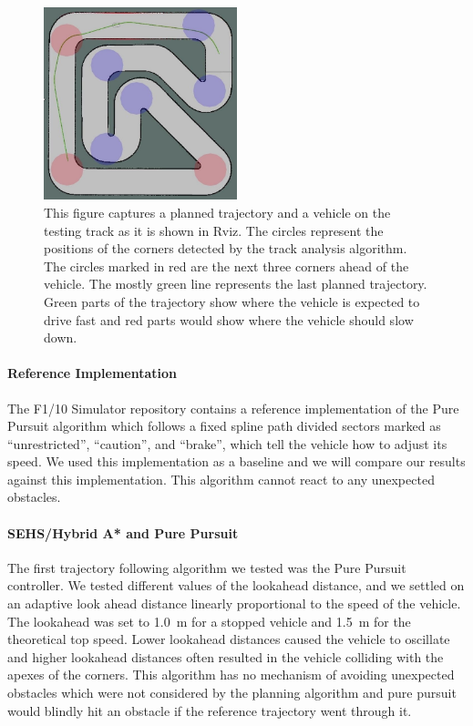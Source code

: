 \begin{figure}
	\centering
	\includegraphics[width=0.5\textwidth]{../img/experiments/rviz-planned-track.jpg}
	\caption{This figure captures a planned trajectory and a vehicle on the testing track as it is shown in Rviz. The circles represent the positions of the corners detected by the track analysis algorithm. The circles marked in red are the next three corners ahead of the vehicle. The mostly green line represents the last planned trajectory. Green parts of the trajectory show where the vehicle is expected to drive fast and red parts would show where the vehicle should slow down.}
	\label{fig:rviz-planned-track}
\end{figure}

\paragraph{Reference Implementation}
The F1/10 Simulator repository contains a reference implementation of the Pure Pursuit algorithm which follows a fixed spline path divided sectors marked as “unrestricted”, “caution”, and “brake”, which tell the vehicle how to adjust its speed. We used this implementation as a baseline and we will compare our results against this implementation. This algorithm cannot react to any unexpected obstacles.

\paragraph{\gls{SEHS}/Hybrid A* and Pure Pursuit}
The first trajectory following algorithm we tested was the Pure Pursuit controller. We tested different values of the lookahead distance, and we settled on an adaptive look ahead distance linearly proportional to the speed of the vehicle. The lookahead was set to \SI{1.0}{\meter} for a stopped vehicle and \SI{1.5}{\meter} for the theoretical top speed. Lower lookahead distances caused the vehicle to oscillate and higher lookahead distances often resulted in the vehicle colliding with the apexes of the corners. This algorithm has no mechanism of avoiding unexpected obstacles which were not considered by the planning algorithm and pure pursuit would blindly hit an obstacle if the reference trajectory went through it.

